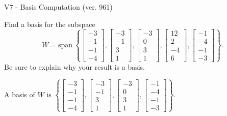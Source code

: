 \begin{exercise}
  \begin{exerciseTitle}V7 - Basis Computation (ver. 961)\end{exerciseTitle}
  \begin{exerciseStatement}
    Find a basis for the subspace 
\[W=\mathrm{span}\ \left\{\left[\begin{array}{r}
-3 \\
-1 \\
-1 \\
-4
\end{array}\right] , \left[\begin{array}{r}
-3 \\
-1 \\
3 \\
1
\end{array}\right] , \left[\begin{array}{r}
-3 \\
0 \\
3 \\
1
\end{array}\right] , \left[\begin{array}{r}
12 \\
2 \\
-4 \\
6
\end{array}\right] , \left[\begin{array}{r}
-1 \\
-4 \\
-1 \\
-3
\end{array}\right]\right\}.\]
 Be sure to explain why your result is a basis.


  \end{exerciseStatement}
  \begin{exerciseAnswer}
   A basis of \(W\) is  \(\left\{\left[\begin{array}{r}
-3 \\
-1 \\
-1 \\
-4
\end{array}\right] , \left[\begin{array}{r}
-3 \\
-1 \\
3 \\
1
\end{array}\right] , \left[\begin{array}{r}
-3 \\
0 \\
3 \\
1
\end{array}\right] , \left[\begin{array}{r}
-1 \\
-4 \\
-1 \\
-3
\end{array}\right]\right\}\).
  


  \end{exerciseAnswer}
\end{exercise}